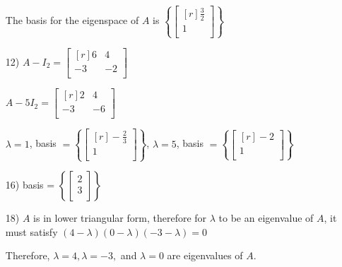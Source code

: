\documentclass{article}
\begin{document}
\begin{enumerate}
    The basis for the eigenspace of $A$ is 
    $\left\{\begin{bmatrix*}[r]
        \frac{3}{2} \\
        1\\
    \end{bmatrix*}\right\}$

  \item[12)]
    $A - I_2 = 
    \begin{bmatrix*}[r]
      6 & 4 \\
      -3 & -2 \\
    \end{bmatrix*}$ 

    $A - 5I_2 = 
    \begin{bmatrix*}[r]
      2 & 4 \\
      -3 & -6 \\
    \end{bmatrix*}$

    $\lambda = 1$, basis $= \left\{
      \begin{bmatrix*}[r]
        -\frac{2}{3} \\
        1 \\
      \end{bmatrix*}
    \right\}$, $\lambda = 5$, basis $=\left\{
      \begin{bmatrix*}[r]
        -2 \\ 
        1 \\
      \end{bmatrix*}
    \right\}$

  \item[16)]
    basis =
    $\left\{
      \begin{bmatrix}
        2 \\
        3 \\
      \end{bmatrix}
    \right\}$

  \item[18)]
    $A$ is in lower triangular form, therefore for $\lambda$ to 
    be an eigenvalue of $A$, it must satisfy
    $(4 - \lambda)(0 - \lambda)(-3 - \lambda) = 0$

    Therefore, $\lambda = 4, \lambda = -3,$ and 
    $\lambda = 0$ are 
    eigenvalues of $A$.
  

\end{enumerate}
\end{document}

